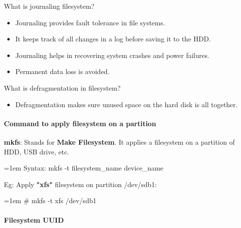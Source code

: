 \begin{flushleft}
\newpage
\begin{tcolorbox}[breakable,notitle,boxrule=1pt,colback=pink,colframe=pink]
	\color{black}
	What is journaling filesystem?
	\begin{itemize}
		\item Journaling provides fault tolerance in file systems.
		\item It keeps track of all changes in a log before saving it to the HDD.
		\item Journaling helps in recovering system crashes and power failures.
		\item Permanent data loss is avoided.
	\end{itemize}
\end{tcolorbox}

\bigskip
\begin{tcolorbox}[breakable,notitle,boxrule=1pt,colback=pink,colframe=pink]
	\color{black}
	What is defragmentation in filesystem?
	\begin{itemize}
		\item Defragmentation makes sure unused space on the hard disk is all together.
	\end{itemize}
\end{tcolorbox}


\newpage

\paragraph{Command to apply filesystem on a partition}
\textbf{mkfs}: Stands for \textbf{Make Filesystem}. It applies a filesystem on a partition of HDD, USB drive, etc.

\bigskip
\begin{tcolorbox}[breakable,notitle,boxrule=-0pt,colback=pink,colframe=pink]
	\color{black}
	\font=1em
	Syntax: mkfs -t filesystem\_name device\_name
	\font=4pt
\end{tcolorbox}

Eg: Apply \textbf{"xfs"} filesystem on partition /dev/sdb1:
\begin{tcolorbox}[breakable,notitle,boxrule=-0pt,colback=black,colframe=black]
	\color{green}
	\font=1em
	\# mkfs -t xfs /dev/sdb1
	\font=4pt
\end{tcolorbox}

\bigskip
\bigskip

\paragraph{Filesystem UUID}


\end{flushleft}
